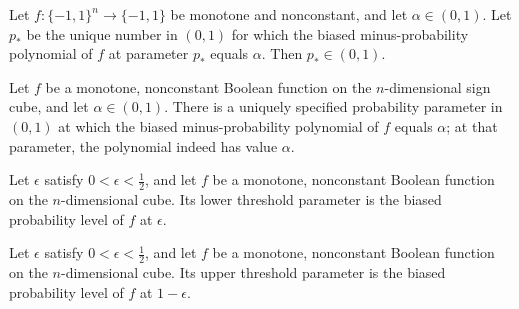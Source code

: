 \begin{theorem}
\label{FABL.biasedProbabilityLevel_mem_Ioo}
\leanok
{}
Let $f:\{-1,1\}^n\to\{-1,1\}$ be monotone and nonconstant, and let $\alpha\in(0,1)$. Let
$p_*$ be the unique number in $(0,1)$ for which the biased minus-probability polynomial
of $f$ at parameter $p_*$ equals $\alpha$. Then $p_*\in(0,1)$.
\end{theorem}

\begin{theorem}
\label{FABL.biasedMinusProbabilityPolynomial_biasedProbabilityLevel}
\leanok
{}
Let $f$ be a monotone, nonconstant Boolean function on the $n$-dimensional sign cube,
and let $\alpha\in(0,1)$. There is a uniquely specified probability parameter in $(0,1)$
at which the biased minus-probability polynomial of $f$ equals $\alpha$; at that
parameter, the polynomial indeed has value $\alpha$.
\end{theorem}

\begin{definition}
\label{FABL.thresholdLowerParameter}
\leanok
{}
Let $\epsilon$ satisfy $0<\epsilon<\tfrac12$, and let $f$ be a monotone, nonconstant
Boolean function on the $n$-dimensional cube. Its lower threshold parameter is the
biased probability level of $f$ at $\epsilon$.
\end{definition}

\begin{definition}
\label{FABL.thresholdUpperParameter}
\leanok
{}
Let $\epsilon$ satisfy $0<\epsilon<\tfrac12$, and let $f$ be a monotone, nonconstant
Boolean function on the $n$-dimensional cube. Its upper threshold parameter is the
biased probability level of $f$ at $1-\epsilon$.
\end{definition}

